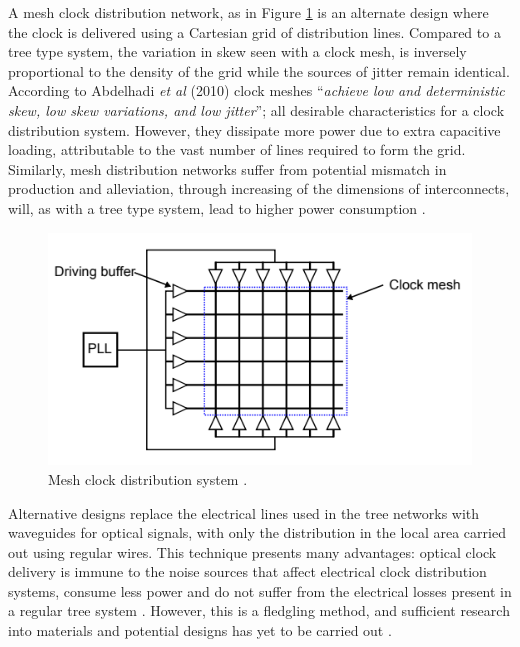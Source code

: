 A mesh clock distribution network, as in Figure \ref{fig:mesh} is an alternate design where the clock is delivered using a Cartesian grid of distribution lines. Compared to a tree type system, the variation in skew seen with a clock mesh, is inversely proportional to the density of the grid while the sources of jitter remain identical. According to Abdelhadi \textit{et al} (2010) clock meshes ``\textit{achieve low and deterministic skew, low skew variations, and low jitter}''; all desirable characteristics for a clock distribution system. However, they dissipate more power due to extra capacitive loading, attributable to the vast number of lines required to form the grid. Similarly, mesh distribution networks suffer from potential mismatch in production and alleviation, through increasing of the dimensions of interconnects, will, as with a tree type system, lead to higher power consumption \cite{abdelhadi2010timing}. 
\begin{figure}[h]
	\centering
	\includegraphics[scale=0.7]{../tex_files/eldar_mesh}
	\caption[Mesh clock distribution system ]{Mesh clock distribution system \cite{zianbetov2013phd}.}
	\label{fig:mesh}
\end{figure}

Alternative designs replace the electrical lines used in the tree networks with waveguides for optical signals, with only the distribution in the local area carried out using regular wires. This technique presents many advantages: optical clock delivery is immune to the noise sources that affect electrical clock distribution systems, consume less power and do not suffer from the electrical losses present in a regular tree system \cite{chen2006chip}. However, this is a fledgling method, and sufficient research into materials and potential designs has yet to be carried out \cite{zianbetov2013phd,chen2006chip}.

